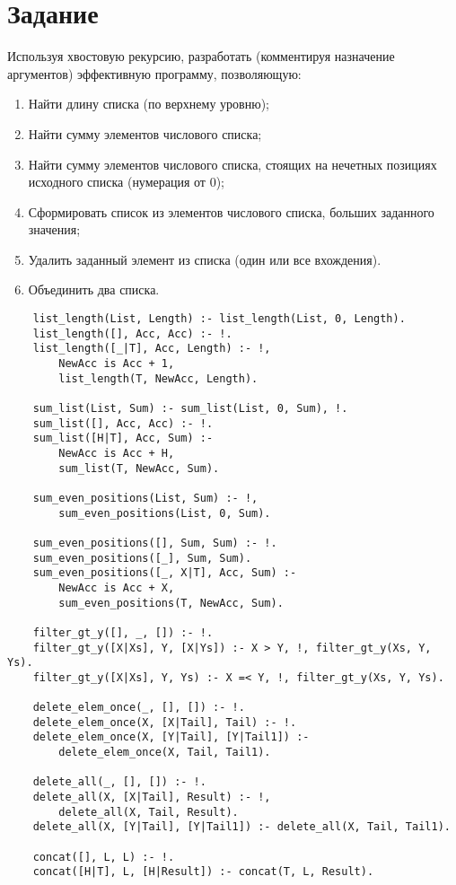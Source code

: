 \chapter*{Задание}

Используя хвостовую рекурсию, разработать (комментируя назначение аргументов)
эффективную программу, позволяющую:

\begin{enumerate}
	\item Найти длину списка (по верхнему уровню);
	\item Найти сумму элементов числового списка;
	\item Найти сумму элементов числового списка, стоящих на нечетных
	      позициях исходного
	      списка (нумерация от 0);
	\item Сформировать список из элементов числового списка, больших
	      заданного значения;
	\item Удалить заданный элемент из списка (один или все вхождения).
	\item Объединить два списка.
\end{enumerate}

\begin{lstlisting}
	list_length(List, Length) :- list_length(List, 0, Length).
	list_length([], Acc, Acc) :- !.
	list_length([_|T], Acc, Length) :- !,
		NewAcc is Acc + 1,
		list_length(T, NewAcc, Length).

	sum_list(List, Sum) :- sum_list(List, 0, Sum), !.
	sum_list([], Acc, Acc) :- !.
	sum_list([H|T], Acc, Sum) :- 
		NewAcc is Acc + H,
		sum_list(T, NewAcc, Sum).

	sum_even_positions(List, Sum) :- !,
		sum_even_positions(List, 0, Sum).

	sum_even_positions([], Sum, Sum) :- !.
	sum_even_positions([_], Sum, Sum).
	sum_even_positions([_, X|T], Acc, Sum) :-
		NewAcc is Acc + X,
		sum_even_positions(T, NewAcc, Sum).

	filter_gt_y([], _, []) :- !.
	filter_gt_y([X|Xs], Y, [X|Ys]) :- X > Y, !, filter_gt_y(Xs, Y, Ys).
	filter_gt_y([X|Xs], Y, Ys) :- X =< Y, !, filter_gt_y(Xs, Y, Ys).

	delete_elem_once(_, [], []) :- !.
	delete_elem_once(X, [X|Tail], Tail) :- !.
	delete_elem_once(X, [Y|Tail], [Y|Tail1]) :-
		delete_elem_once(X, Tail, Tail1).

	delete_all(_, [], []) :- !.
	delete_all(X, [X|Tail], Result) :- !,
		delete_all(X, Tail, Result).
	delete_all(X, [Y|Tail], [Y|Tail1]) :- delete_all(X, Tail, Tail1).

	concat([], L, L) :- !.
	concat([H|T], L, [H|Result]) :- concat(T, L, Result).
\end{lstlisting}

